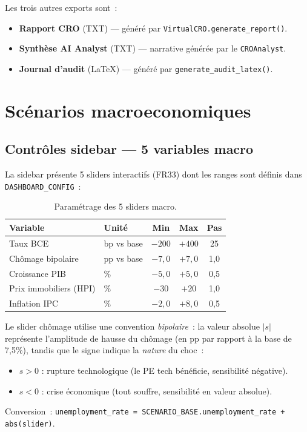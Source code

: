 \documentclass[12pt,a4paper]{article}
\begin{document}
Les trois autres exports sont~:
\begin{itemize}[leftmargin=2em]
    \item \textbf{Rapport CRO} (TXT) --- g\'en\'er\'e par \texttt{VirtualCRO.generate\_report()}.
    \item \textbf{Synth\`ese AI Analyst} (TXT) --- narrative g\'en\'er\'ee par le \texttt{CROAnalyst}.
    \item \textbf{Journal d'audit} (\LaTeX{}) --- g\'en\'er\'e par \texttt{generate\_audit\_latex()}.
\end{itemize}


\section{Sc\'enarios macroeconomiques}
\label{sec:scenarios}

\subsection{Contr\^oles sidebar --- 5 variables macro}

La sidebar pr\'esente 5 sliders interactifs (FR33) dont les ranges sont d\'efinis dans \texttt{DASHBOARD\_CONFIG}~:

\begin{table}[ht]
\centering
\caption{Param\'etrage des 5 sliders macro.}
\label{tab:sliders}
\small
\begin{tabular}{@{}llccc@{}}
\toprule
\textbf{Variable} & \textbf{Unit\'e} & \textbf{Min} & \textbf{Max} & \textbf{Pas} \\
\midrule
Taux BCE & bp vs base & $-200$ & $+400$ & 25 \\
Ch\^omage bipolaire & pp vs base & $-7{,}0$ & $+7{,}0$ & 1,0 \\
Croissance PIB & \% & $-5{,}0$ & $+5{,}0$ & 0,5 \\
Prix immobiliers (HPI) & \% & $-30$ & $+20$ & 1,0 \\
Inflation IPC & \% & $-2{,}0$ & $+8{,}0$ & 0,5 \\
\bottomrule
\end{tabular}
\end{table}

\begin{warningbox}
Le slider ch\^omage utilise une convention \emph{bipolaire}~: la valeur absolue $|s|$ repr\'esente l'amplitude de hausse du ch\^omage (en pp par rapport \`a la base de 7,5\%), tandis que le signe indique la \emph{nature} du choc~:
\begin{itemize}[leftmargin=1em]
    \item $s > 0$ : rupture technologique (le PE tech b\'en\'eficie, sensibilit\'e n\'egative).
    \item $s < 0$ : crise \'economique (tout souffre, sensibilit\'e en valeur absolue).
\end{itemize}
Conversion~: \texttt{unemployment\_rate = SCENARIO\_BASE.unemployment\_rate + abs(slider)}.
\end{warningbox}
\end{document}

